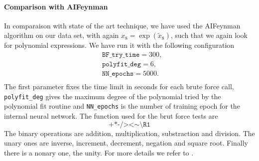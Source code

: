 \documentclass[11pt]{article}
\begin{document}
\paragraph{Comparison with AIFeynman}
In comparaison with state of the art technique, we have used the AIFeynman algorithm on our data set, with again $x_8 = \exp(\tilde{x}_8)$, such that we again look for polynomial expressions. We have run it with the following configuration 
\begin{equation}
	\begin{aligned}
		&\texttt{BF\_try\_time} = 300, \\
		&\texttt{polyfit\_deg} = 6, \\
		&\texttt{NN\_epochs} = 5000.\\
	\end{aligned}
\end{equation}
The first parameter fixes the time limit in seconds for each brute force call, \texttt{polyfit\_deg} gives the maximum degree of the polynomial tried by the polynomial fit routine and \texttt{NN\_epochs} is the number of training epoch for the internal neural network. The function used for the brut force tests are 
\begin{equation}
\texttt{+*-/><} \sim \texttt{\textbackslash R1}
\end{equation}
The binary operations are addition, multiplication, substraction and division. The unary ones are inverse, increment, decrement, negation and square root. Finally there is a nonary one, the unity. For more details we refer to \cite{Udrescu:2019mnk}.
\end{document}
